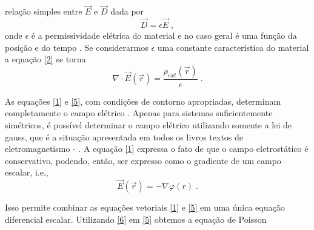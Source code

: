 \documentclass[brazilian,10.7pt,a4paper]{article}
\begin{document}
\begin{multicols}{2}
relação simples entre $\vec{E}$ e $\vec{D}$ dada por
\\
\begin{equation}\label{4}
\vec{D} = \epsilon\vec{E}\;,
\end{equation}
onde $\epsilon$ é a permissividade elétrica do material e no caso geral é uma função da posição e do tempo \cite{andrade}. Se considerarmos $\epsilon$ uma constante característica do material a equação \eqref{2} se torna
\\
\begin{equation}\label{5}
\nabla\cdot\vec{E}(\vec{r})=\frac{\rho_{ext}(\vec{r})}{\epsilon}\;.
\end{equation}
\par As equações \eqref{1} e \eqref{5}, com condições de contorno apropriadas, determinam completamente o campo elétrico \cite{tort}. Apenas para sistemas suficientemente simétricos, é possível determinar o campo elétrico utilizando somente a lei de gauss, que é a situação apresentada em todos os livros textos de eletromagnetismo \cite{hm} - \cite{jackson}. A equação \eqref{1} expressa o fato de que o campo eletrostático é conservativo, podendo, então, ser expresso como o gradiente de um campo escalar, i.e., %
\\
\begin{equation}\label{6}
\vec{E}(\vec{r})= -\nabla\varphi(r)\;.
\end{equation}
\par Isso permite combinar as equações vetoriais \eqref{1} e \eqref{5} em uma única equação diferencial escalar. Utilizando \eqref{6} em \eqref{5} obtemos a equação de Poisson


\end{multicols}
\end{document}
